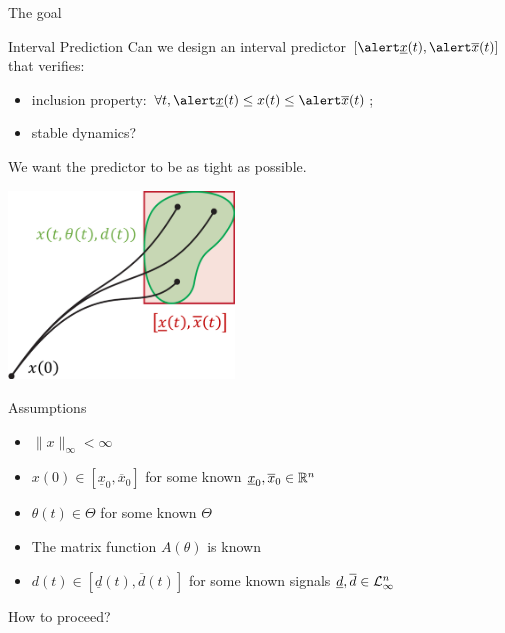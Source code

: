 \documentclass[slideopt,A4,showboxes,svgnames]{beamer}
\begin{document}
\begin{frame}{The goal}
\begin{block}{Interval Prediction}
	Can we design an interval predictor $[\ux, \ox]$ that verifies:
	\vspace*{0.175cm}
	\begin{itemize}
		\item inclusion property: $\forall t, \ux \leq x(t) \leq \ox$;
		\item stable dynamics?
	\end{itemize}
	\vspace*{0.175cm}
	We want the predictor to be as tight as possible.

\end{block}

\centering
\includegraphics[width=0.45\textwidth]{img/interval-hull}
\end{frame}

\begin{frame}{Assumptions}
\begin{assumption}
	\begin{itemize}
		\item $\|x\|_{\infty} < \infty$
		\item $x(0)\in[\underline{x}_{0},\overline{x}_{0}]$ for some \alert{known} $\underline{x}_{0},\overline{x}_{0}\in\mathbb{R}^{n}$
	\end{itemize}
\end{assumption}
\pause
\begin{assumption}
	\begin{itemize}
		\item $\theta(t)\in\Theta$ for some \alert{known} $\Theta$
		\item The matrix function $A(\theta)$ is \alert{known}
	\end{itemize}
	\end{assumption}
\pause
\begin{assumption}
	\begin{itemize}
		\item $d(t)\in[\underline{d}(t),\overline{d}(t)]$ for some \alert{known} signals $\underline{d},\overline{d}\in\mathcal{L}_{\infty}^{n}$
	\end{itemize}
\end{assumption}

\begin{flushright}
	How to proceed?
\end{flushright}
\end{frame}
\end{document}
